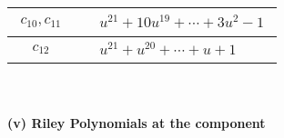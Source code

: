 \documentclass[1p]{elsarticle_modified}
\theoremstyle{definition}
\begin{document}
\begin{tabular}{m{50pt}|m{274pt}}
\hline $$\begin{aligned}c_{10},c_{11}\end{aligned}$$&$\begin{aligned}
&u^{21}+10 u^{19}+\cdots+3 u^2-1
\end{aligned}$\\
\hline $$\begin{aligned}c_{12}\end{aligned}$$&$\begin{aligned}
&u^{21}+u^{20}+\cdots+u+1
\end{aligned}$\\
\hline
\end{tabular}\\~\\
\newpage\renewcommand{\arraystretch}{1}
\flushleft \textbf{(v) Riley Polynomials at the component}\newline \\
\end{document}
